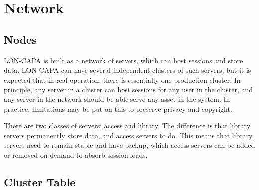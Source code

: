 \chapter{Network}
\section{Nodes}
LON-CAPA is built as a network of servers, which can host sessions and store data. LON-CAPA can have several independent clusters of such servers, but it is expected that in real operation, there is essentially one production cluster. In principle, any server in a cluster can host sessions for any user in the cluster, and any server in the network should be able serve any asset in the system. In practice, limitations may be put on this to preserve privacy and copyright.

There are two classes of servers: access and library. The difference is that library servers permanently store data, and access servers to do. This means that library servers need to remain stable and have backup, which access servers can be added or removed on demand to absorb session loads.
\section{Cluster Table}
